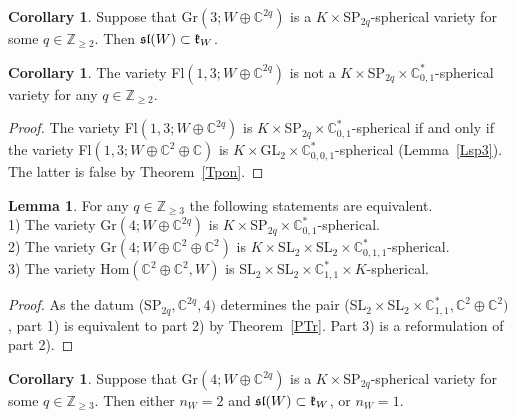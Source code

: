 \documentclass[12pt]{amsart}
\theoremstyle{definition}\newtheorem{theorem}{Theorem}[section]
\newtheorem{lemma}[proposition]{Lemma}
\newtheorem{corollary}[proposition]{Corollary}
\theoremstyle{definition}\newtheorem{definition}[proposition]{Definition}
\theoremstyle{remark}\newtheorem{example}[proposition]{Example}
\begin{document}
\begin{corollary}\label{SP=1} Suppose that Gr$(3; W\oplus\mathbb C^{2q})$ is a $K\times$SP$_{2q}$-spherical variety for some $q\in\mathbb Z_{\ge2}$. Then $\frak{sl}(W)\subset\frak k_W$.\end{corollary}
\begin{corollary}\label{Cflnesp} The variety Fl$(1, 3; W\oplus\mathbb C^{2q})$ is not a $K\times$SP$_{2q}\times\mathbb C^*_{0,1}$-spherical variety for any $q\in\mathbb Z_{\ge2}$.\end{corollary}
\begin{proof}The variety Fl$(1, 3; W\oplus\mathbb C^{2q})$ is $K\times$SP$_{2q}\times\mathbb C^*_{0,1}$-spherical if and only if the variety Fl$(1, 3; W\oplus\mathbb C^2\oplus\mathbb C)$ is $K\times$GL$_2\times\mathbb C^*_{0,0,1}$-spherical (Lemma~\ref{Lsp3}). The latter is false by Theorem~\ref{Tpon}.\end{proof}
\begin{lemma} For any $q\in\mathbb Z_{\ge3}$ the following statements are equivalent.\\1) The variety Gr$(4; W\oplus\mathbb C^{2q})$ is $K\times$SP$_{2q}\times\mathbb C^*_{0,1}$-spherical.\\2) The variety Gr$(4; W\oplus\mathbb C^2\oplus\mathbb C^2)$ is $K\times$SL$_2\times$SL$_2\times\mathbb C^*_{0,1,1}$-spherical.\\3) The variety Hom$(\mathbb C^2\oplus\mathbb C^2, W)$ is SL$_2\times$SL$_2\times \mathbb C^*_{1,1}\times K$-spherical.\end{lemma}
\begin{proof}As the datum (SP$_{2q}, \mathbb C^{2q}, 4)$ determines the pair (SL$_2\times$SL$_2\times\mathbb C^*_{1,1}, \mathbb C^2\oplus\mathbb C^2)$, part 1) is equivalent to part 2) by Theorem~\ref{PTr}. Part 3) is a reformulation of part 2).\end{proof}
\begin{corollary}\label{SPG4} Suppose that Gr$(4; W\oplus\mathbb C^{2q})$ is a $K\times$SP$_{2q}$-spherical variety for some $q\in\mathbb Z_{\ge3}$. Then either $n_W=2$ and $\frak{sl}(W)\subset\frak k_W$, or $n_W=1$.\end{corollary}
\end{document}
